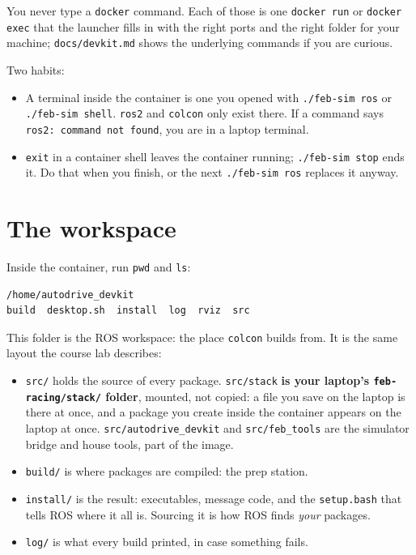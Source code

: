 \documentclass[11pt,a4paper]{article}
\begin{document}
\smallskip
You never type a \texttt{docker} command. Each of those is one \texttt{docker run} or
\texttt{docker exec} that the launcher fills in with the right ports and the right folder for
your machine; \texttt{docs/devkit.md} shows the underlying commands if you are curious.

Two habits:
\begin{itemize}
  \item A terminal inside the container is one you opened with \texttt{./feb-sim ros} or
  \texttt{./feb-sim shell}. \texttt{ros2} and \texttt{colcon} only exist there. If a command says
  \texttt{ros2: command not found}, you are in a laptop terminal.
  \item \texttt{exit} in a container shell leaves the container running; \texttt{./feb-sim stop}
  ends it. Do that when you finish, or the next \texttt{./feb-sim ros} replaces it anyway.
\end{itemize}

\section{The workspace}

Inside the container, run \texttt{pwd} and \texttt{ls}:

\begin{lstlisting}
/home/autodrive_devkit
build  desktop.sh  install  log  rviz  src
\end{lstlisting}

This folder is the ROS workspace: the place \texttt{colcon} builds from. It is the same layout
the course lab describes:

\begin{itemize}
  \item \texttt{src/} holds the source of every package. \texttt{src/stack} \textbf{is your laptop's
  \texttt{feb-racing/stack/} folder}, mounted, not copied: a file you save on the laptop is there
  at once, and a package you create inside the container appears on the laptop at once.
  \texttt{src/autodrive\_devkit} and \texttt{src/feb\_tools} are the simulator bridge and house
  tools, part of the image.
  \item \texttt{build/} is where packages are compiled: the prep station.
  \item \texttt{install/} is the result: executables, message code, and the \texttt{setup.bash} that
  tells ROS where it all is. Sourcing it is how ROS finds \emph{your} packages.
  \item \texttt{log/} is what every build printed, in case something fails.
\end{itemize}
\end{document}
